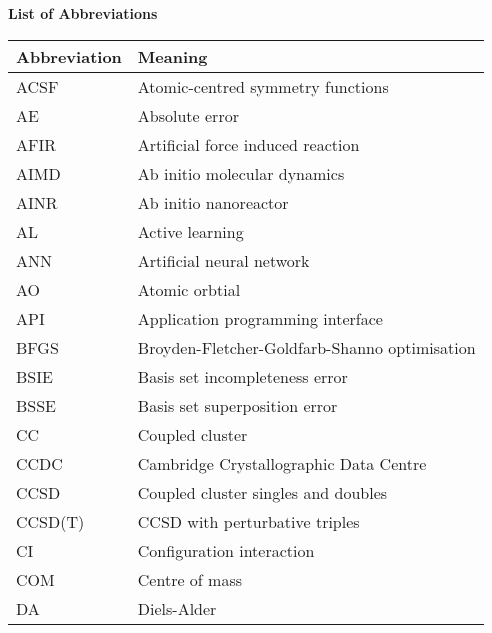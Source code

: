 \documentclass[../main.tex]{subfiles}
\begin{document}
\begin{center}
		{\bfseries\Large \textsf{List of Abbreviations}}
\end{center}
\begin{table}[h!]
\def\arraystretch{2.0}
\begin{tabularx}{\textwidth}{YY}
Abbreviation & Meaning \\
\hline
ACSF	&	Atomic-centred symmetry functions	\\
AE	&	Absolute error	\\
AFIR	&	Artificial force induced reaction	\\
AIMD	&	Ab initio molecular dynamics	\\
AINR	&	Ab initio nanoreactor	\\
AL	&	Active learning	\\
ANN	&	Artificial neural network	\\
AO	&	Atomic orbtial	\\
API	&	Application programming interface	\\
BFGS	&	Broyden-Fletcher-Goldfarb-Shanno optimisation	\\
BSIE	&	Basis set incompleteness error	\\
BSSE	&	Basis set superposition error	\\
CC	&	Coupled cluster	\\
CCDC	&	Cambridge Crystallographic Data Centre	\\
CCSD	&	Coupled cluster singles and doubles	\\
CCSD(T)	&	CCSD with perturbative triples	\\
CI	&	Configuration interaction	\\
COM	&	Centre of mass	\\
DA	&	Diels-Alder	\\
\end{tabularx}
\end{table}
\newpage
\end{document}
